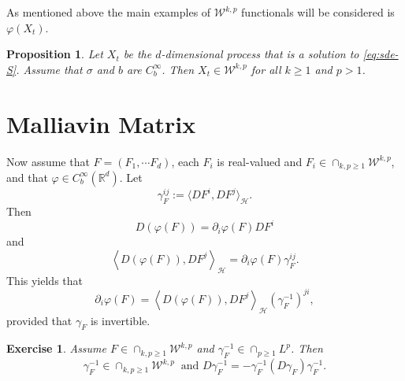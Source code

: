 \documentclass[twoside, 12pt]{book}
\numberwithin{equation}{chapter}
\newtheorem{proposition}[theorem]{Proposition}
\newtheorem{exercise}{Exercise}[section]
\def\cH{{\mathcal H}}
\def\mR{{\mathbb R}}
\def\sW{{\mathscr W}}
\def\<{\langle}
\def\>{\rangle}
\def\geq{\geqslant}
\begin{document}
    As mentioned above the main examples of $\sW^{k,p}$ functionals will be considered is $\varphi(X_t)$.
    \begin{proposition}
    	Let  $X_t$ be the $d$-dimensional process that is a solution to \eqref{eq:sde-S}. Assume that $\sigma$ and $b$ are $C^{\infty}_b$. Then $X_t \in \sW^{k,p}$ for all $k\geq 1$ and $p>1$.  
    \end{proposition}
    
    \section{Malliavin Matrix}
    Now assume that $F=(F_1,\cdots F_d)$, each $F_i$ is real-valued and $F_i\in \cap_{k,p\geq 1}\sW^{k,p}$, and that $\varphi\in C^\infty_b(\mR^d)$. Let 
    \[
        \gamma_F^{ij}:= \<DF^i, DF^j\>_{\cH}. 
    \]
    Then 
    \[
        D(\varphi(F))= \partial_i \varphi(F) D F^i
    \]
    and 
    \[
        \left\langle D(\varphi(F)), D F^j\right\rangle_\cH= \partial_i \varphi(F) \gamma_F^{i j} . 
    \]
    This yields that 
    \begin{equation}\label{eq:d-phiF}
    	\partial_i \varphi(F)= \left\langle D(\varphi(F)), D F^j\right\rangle_{\cH}\left(\gamma_F^{-1}\right)^{j i},
    \end{equation}
    provided that $\gamma_{F}$ is invertible. 
    
    \begin{exercise}
    	Assume $F\in \cap_{k,p\geq 1}\sW^{k,p}$ and $\gamma_F^{-1}\in \cap_{p\geq 1} L^{p}$. Then 
    	\[
    	    \gamma_F^{-1}\in  \cap_{k,p\geq 1}\sW^{k,p} ~ \mbox{ and }D\gamma_F^{-1}= -\gamma_F^{-1} (D\gamma_F) \gamma_F^{-1}. 
    	\]
    \end{exercise}
    
\end{document}

